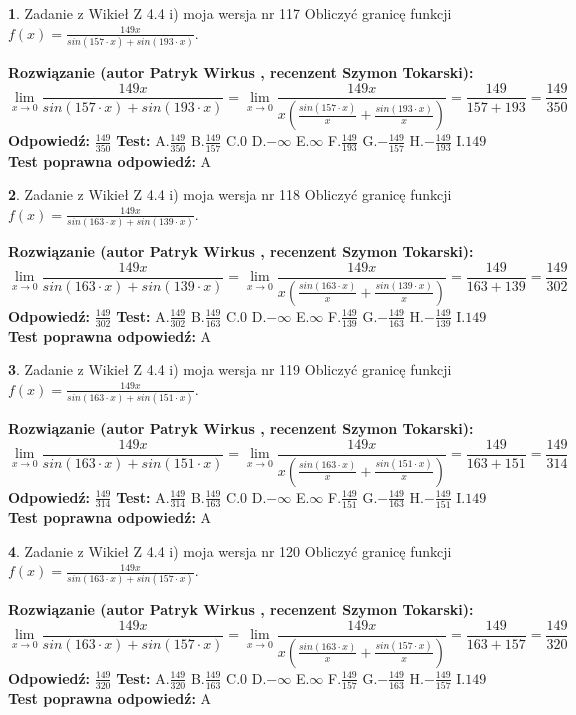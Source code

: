 \documentclass[12pt, a4paper]{article}
\theoremstyle{definition} %
\newtheorem{zad}{}
\newcommand{\zadStart}[1]{\begin{zad}#1\newline}
\newcommand{\zadStop}{\end{zad}}
\newcommand{\rozwStart}[2]{\noindent \textbf{Rozwiązanie (autor #1 , recenzent #2): }\newline}
\newcommand{\rozwStop}{\newline}
\newcommand{\odpStart}{\noindent \textbf{Odpowiedź:}\newline}
\newcommand{\odpStop}{\newline}
\newcommand{\testStart}{\noindent \textbf{Test:}\newline}
\newcommand{\testStop}{\newline}
\newcommand{\kluczStart}{\noindent \textbf{Test poprawna odpowiedź:}\newline}
\newcommand{\kluczStop}{\newline}
\begin{document}
\zadStart{Zadanie z Wikieł Z 4.4 i) moja wersja nr 117}
Obliczyć granicę funkcji $f(x)=\frac{149x}{sin(157\cdot x) +sin(193\cdot x)}$.
\zadStop
\rozwStart{Patryk Wirkus}{Szymon Tokarski}
$$\lim\limits_{x\to 0}\frac{149x}{sin(157\cdot x) +sin(193\cdot x)}=\lim\limits_{x\to 0}\frac{149x}{x(\frac{sin(157\cdot x)}{x}+\frac{sin(193\cdot x)}{x})}=\frac{149}{157+193} = \frac{149}{350}$$
\rozwStop
\odpStart
$\frac{149}{350}$
\odpStop
\testStart
A.$\frac{149}{350}$
B.$\frac{149}{157}$
C.$0$
D.$-\infty$
E.$\infty$
F.$\frac{149}{193}$
G.$-\frac{149}{157}$
H.$-\frac{149}{193}$
I.$149$
\testStop
\kluczStart
A
\kluczStop



\zadStart{Zadanie z Wikieł Z 4.4 i) moja wersja nr 118}
Obliczyć granicę funkcji $f(x)=\frac{149x}{sin(163\cdot x) +sin(139\cdot x)}$.
\zadStop
\rozwStart{Patryk Wirkus}{Szymon Tokarski}
$$\lim\limits_{x\to 0}\frac{149x}{sin(163\cdot x) +sin(139\cdot x)}=\lim\limits_{x\to 0}\frac{149x}{x(\frac{sin(163\cdot x)}{x}+\frac{sin(139\cdot x)}{x})}=\frac{149}{163+139} = \frac{149}{302}$$
\rozwStop
\odpStart
$\frac{149}{302}$
\odpStop
\testStart
A.$\frac{149}{302}$
B.$\frac{149}{163}$
C.$0$
D.$-\infty$
E.$\infty$
F.$\frac{149}{139}$
G.$-\frac{149}{163}$
H.$-\frac{149}{139}$
I.$149$
\testStop
\kluczStart
A
\kluczStop



\zadStart{Zadanie z Wikieł Z 4.4 i) moja wersja nr 119}
Obliczyć granicę funkcji $f(x)=\frac{149x}{sin(163\cdot x) +sin(151\cdot x)}$.
\zadStop
\rozwStart{Patryk Wirkus}{Szymon Tokarski}
$$\lim\limits_{x\to 0}\frac{149x}{sin(163\cdot x) +sin(151\cdot x)}=\lim\limits_{x\to 0}\frac{149x}{x(\frac{sin(163\cdot x)}{x}+\frac{sin(151\cdot x)}{x})}=\frac{149}{163+151} = \frac{149}{314}$$
\rozwStop
\odpStart
$\frac{149}{314}$
\odpStop
\testStart
A.$\frac{149}{314}$
B.$\frac{149}{163}$
C.$0$
D.$-\infty$
E.$\infty$
F.$\frac{149}{151}$
G.$-\frac{149}{163}$
H.$-\frac{149}{151}$
I.$149$
\testStop
\kluczStart
A
\kluczStop



\zadStart{Zadanie z Wikieł Z 4.4 i) moja wersja nr 120}
Obliczyć granicę funkcji $f(x)=\frac{149x}{sin(163\cdot x) +sin(157\cdot x)}$.
\zadStop
\rozwStart{Patryk Wirkus}{Szymon Tokarski}
$$\lim\limits_{x\to 0}\frac{149x}{sin(163\cdot x) +sin(157\cdot x)}=\lim\limits_{x\to 0}\frac{149x}{x(\frac{sin(163\cdot x)}{x}+\frac{sin(157\cdot x)}{x})}=\frac{149}{163+157} = \frac{149}{320}$$
\rozwStop
\odpStart
$\frac{149}{320}$
\odpStop
\testStart
A.$\frac{149}{320}$
B.$\frac{149}{163}$
C.$0$
D.$-\infty$
E.$\infty$
F.$\frac{149}{157}$
G.$-\frac{149}{163}$
H.$-\frac{149}{157}$
I.$149$
\testStop
\kluczStart
A
\kluczStop
\end{document}
